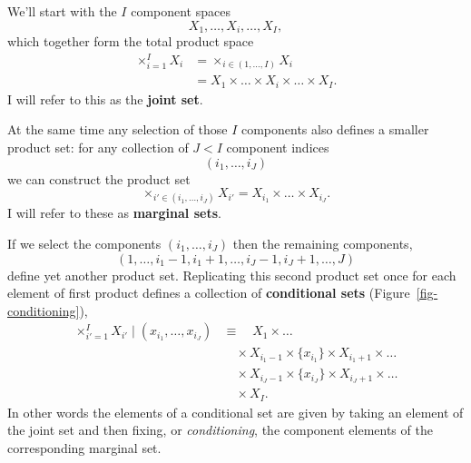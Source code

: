 \documentclass[
  letterpaper,
  DIV=11,
  numbers=noendperiod]{scrartcl}
\begin{document}
We'll start with the \(I\) component spaces \[
X_{1}, \ldots, X_{i}, \ldots, X_{I},
\] which together form the total product space \begin{align*}
\times_{i = 1}^{I} X_{i}
&= \times_{i \in (1, \ldots, I )} X_{i}
\\
&= X_{1} \times \ldots \times X_{i} \times \ldots \times X_{I}.
\end{align*} I will refer to this as the \textbf{joint set}.

At the same time any selection of those \(I\) components also defines a
smaller product set: for any collection of \(J < I\) component indices
\[
( i_{1}, \ldots, i_{J} )
\] we can construct the product set \[
\times_{ i' \in ( i_{1}, \ldots, i_{J} ) } X_{i'}
=
X_{i_{1}} \times \ldots \times X_{i_{J}}.
\] I will refer to these as \textbf{marginal sets}.

If we select the components \(( i_{1}, \ldots, i_{J} )\) then the
remaining components, \[
( 1, \ldots, i_{1} - 1, i_{1} + 1, \ldots, i_{J} - 1, i_{J} + 1, \ldots, J )
\] define yet another product set. Replicating this second product set
once for each element of first product defines a collection of
\textbf{conditional sets} (Figure~\ref{fig-conditioning}),
\begin{align*}
\times_{i' = 1}^{I} X_{i'} \mid (x_{i_{1}}, \ldots, x_{i_{J}})
&\equiv \quad
X_{1} \times \ldots
\\
&\quad \times
X_{i_{1} - 1} \times \{ x_{i_{1}} \} \times X_{i_{1} + 1} \times \ldots
\\
&\quad \times
X_{i_{J} - 1} \times \{ x_{i_{J}} \} \times X_{i_{J} + 1} \times \ldots
\\
&\quad \times X_{I}.
\end{align*} In other words the elements of a conditional set are given
by taking an element of the joint set and then fixing, or
\emph{conditioning}, the component elements of the corresponding
marginal set.
\end{document}
